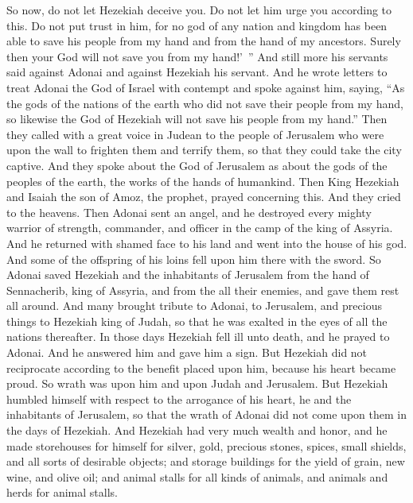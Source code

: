 \begin{biblechapter}
\verse So now, do not let Hezekiah deceive you. Do not let him urge you according to this. Do not put trust in him, for no god of any nation and kingdom has been able to save his people from my hand and from the hand of my ancestors. Surely then your God will not save you from my hand!’ ”
\verse And still more his servants said against Adonai and against Hezekiah his servant.
\verse And he wrote letters to treat Adonai the God of Israel with contempt and spoke against him, saying, “As the gods of the nations of the earth who did not save their people from my hand, so likewise the God of Hezekiah will not save his people from my hand.”
\verse Then they called with a great voice in Judean to the people of Jerusalem who were upon the wall to frighten them and terrify them, so that they could take the city captive.
\verse And they spoke about the God of Jerusalem as about the gods of the peoples of the earth, the works of the hands of humankind.
 Then King Hezekiah and Isaiah the son of Amoz, the prophet, prayed concerning this. And they cried to the heavens.
\verse Then Adonai sent an angel, and he destroyed every mighty warrior of strength, commander, and officer in the camp of the king of Assyria. And he returned with shamed face to his land and went into the house of his god. And some of the offspring of his loins fell upon him there with the sword.
\verse So Adonai saved Hezekiah and the inhabitants of Jerusalem from the hand of Sennacherib, king of Assyria, and from the all their enemies, and gave them rest all around.
\verse And many brought tribute to Adonai, to Jerusalem, and precious things to Hezekiah king of Judah, so that he was exalted in the eyes of all the nations thereafter.
 In those days Hezekiah fell ill unto death, and he prayed to Adonai. And he answered him and gave him a sign.
\verse But Hezekiah did not reciprocate according to the benefit placed upon him, because his heart became proud. So wrath was upon him and upon Judah and Jerusalem.
\verse But Hezekiah humbled himself with respect to the arrogance of his heart, he and the inhabitants of Jerusalem, so that the wrath of Adonai did not come upon them in the days of Hezekiah.
\verse And Hezekiah had very much wealth and honor, and he made storehouses for himself for silver, gold, precious stones, spices, small shields, and all sorts of desirable objects;
\verse and storage buildings for the yield of grain, new wine, and olive oil; and animal stalls for all kinds of animals, and animals and herds for animal stalls.

\end{biblechapter}
